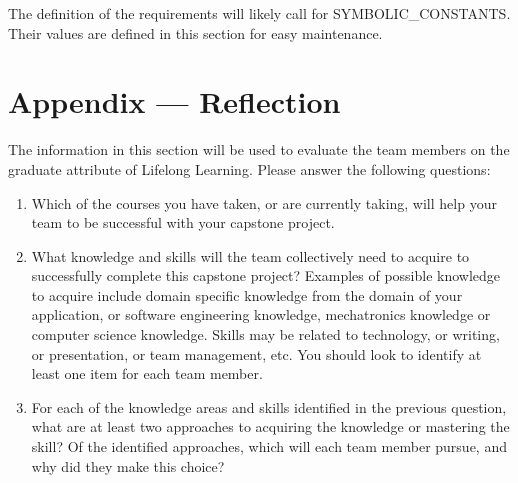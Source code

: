 \documentclass[12pt, titlepage]{article}
\begin{document}
The definition of the requirements will likely call for SYMBOLIC\_CONSTANTS.
Their values are defined in this section for easy maintenance.

\section{Appendix --- Reflection}

The information in this section will be used to evaluate the team members on the
graduate attribute of Lifelong Learning.  Please answer the following questions:

\begin{enumerate}
  \item Which of the courses you have taken, or are currently taking, will help
  your team to be successful with your capstone project.
  \item What knowledge and skills will the team collectively need to acquire to
  successfully complete this capstone project?  Examples of possible knowledge
  to acquire include domain specific knowledge from the domain of your
  application, or software engineering knowledge, mechatronics knowledge or
  computer science knowledge.  Skills may be related to technology, or writing,
  or presentation, or team management, etc.  You should look to identify at
  least one item for each team member.
  \item For each of the knowledge areas and skills identified in the previous
  question, what are at least two approaches to acquiring the knowledge or
  mastering the skill?  Of the identified approaches, which will each team
  member pursue, and why did they make this choice?
\end{enumerate}
\end{document}
